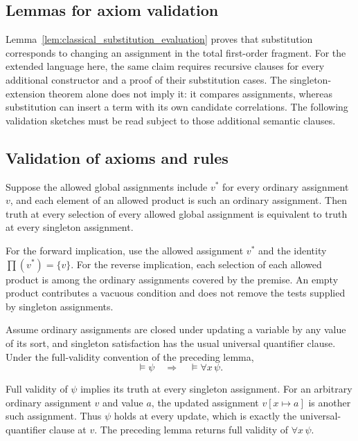 \subsection{Lemmas for axiom validation}
Lemma~\ref{lem:classical_substitution_evaluation} proves that substitution
corresponds to changing an assignment in the total first-order fragment.
For the extended language here, the same claim requires recursive clauses
for every additional constructor and a proof of their substitution cases.
The singleton-extension theorem alone does not imply it: it compares
assignments, whereas substitution can insert a term with its own candidate
correlations. The following validation sketches must be read subject to
those additional semantic clauses.
\subsection{Validation of axioms and rules}
\begin{lemma}
Suppose the allowed global assignments include $v^*$ for every ordinary
assignment $v$, and each element of an allowed product is such an ordinary
assignment. Then truth at every selection of every allowed global
assignment is equivalent to truth at every singleton assignment.
\end{lemma}
\Proof
For the forward implication, use the allowed assignment $v^*$ and the
identity $\prod(v^*)=\{v\}$. For the reverse implication, each selection
of each allowed product is among the ordinary assignments covered by the
premise. An empty product contributes a vacuous condition and does not
remove the tests supplied by singleton assignments.
\Done

\begin{theorem}
Assume ordinary assignments are closed under updating a variable by any
value of its sort, and singleton satisfaction has the usual universal
quantifier clause. Under the full-validity convention of the preceding
lemma,
\[
\models\psi\quad\Longrightarrow\quad\models\forall x\,\psi.
\]
\end{theorem}
\Proof
Full validity of $\psi$ implies its truth at every singleton assignment.
For an arbitrary ordinary assignment $v$ and value $a$, the updated
assignment $v[x\mapsto a]$ is another such assignment. Thus $\psi$ holds
at every update, which is exactly the universal-quantifier clause at $v$.
The preceding lemma returns full validity of $\forall x\,\psi$.
\Done

